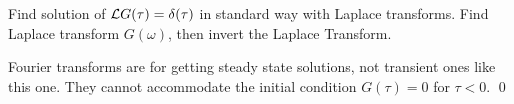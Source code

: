 Find solution of ${\cal L} G(\tau)=\delta(\tau)$ in standard way with Laplace transforms.
Find Laplace transform $G(\omega)$, then invert the Laplace Transform.  

Fourier transforms
are for getting steady state solutions,
not transient ones like this one. They cannot accommodate the initial condition $G(\tau)=0$
for $\tau<0$.
\qed
